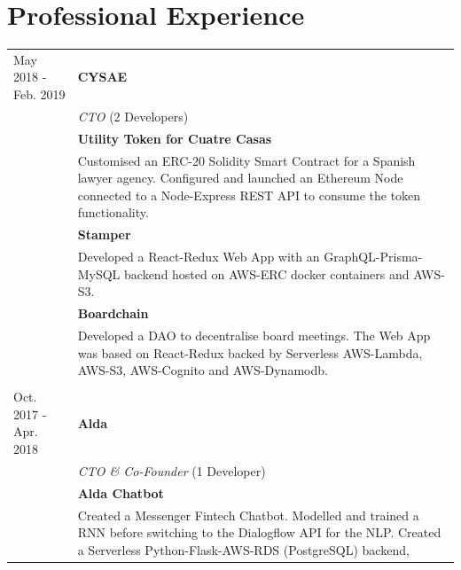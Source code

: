 \documentclass[11pt]{article}
\begin{document}
\section*{Professional Experience}
\begin{tabularx}{\textwidth}{lX}
  May 2018 - Feb. 2019   & \textbf{CYSAE} \\
                         & \textit{CTO} (2 Developers) \\[2mm]
                         & \textbf{Utility Token for Cuatre Casas} \\
                         & Customised an ERC-20 Solidity Smart Contract for
                           a Spanish lawyer agency. Configured and launched an
                           Ethereum Node connected to a Node-Express REST API to consume
                           the token functionality. \\[1.5mm]
                         & \textbf{Stamper} \\
                         & Developed a React-Redux Web App with an
                           GraphQL-Prisma-MySQL backend hosted on AWS-ERC docker
                           containers and AWS-S3. \\[1.5mm]
                         & \textbf{Boardchain} \\
                         & Developed a DAO to decentralise board meetings. The
                           Web App was based on React-Redux backed by
                           Serverless AWS-Lambda, AWS-S3, AWS-Cognito and AWS-Dynamodb. \\\\
  Oct. 2017 - Apr. 2018  & \textbf{Alda} \\
                         & \textit{CTO \& Co-Founder} (1 Developer) \\[2mm]
                         & \textbf{Alda Chatbot} \\
                         & Created a Messenger Fintech Chatbot. Modelled and
                           trained a RNN before switching to the Dialogflow API
                           for the NLP. Created a Serverless Python-Flask-AWS-RDS (PostgreSQL) backend,

\end{tabularx}
\end{document}
